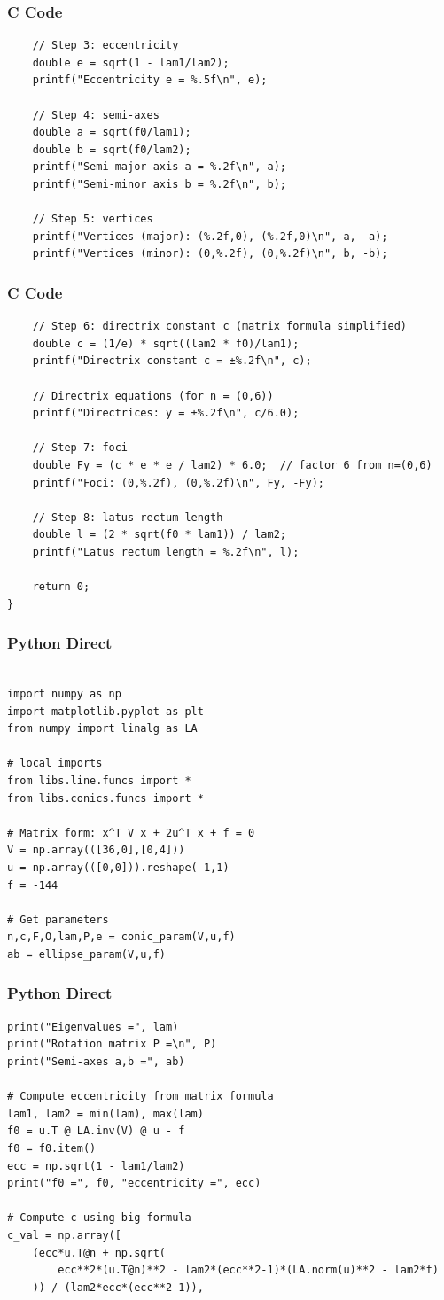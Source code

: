 \documentclass{beamer}
\begin{document}
\begin{frame}[fragile]
    \frametitle{C Code}
    \begin{lstlisting}
    // Step 3: eccentricity
    double e = sqrt(1 - lam1/lam2);
    printf("Eccentricity e = %.5f\n", e);

    // Step 4: semi-axes
    double a = sqrt(f0/lam1);
    double b = sqrt(f0/lam2);
    printf("Semi-major axis a = %.2f\n", a);
    printf("Semi-minor axis b = %.2f\n", b);

    // Step 5: vertices
    printf("Vertices (major): (%.2f,0), (%.2f,0)\n", a, -a);
    printf("Vertices (minor): (0,%.2f), (0,%.2f)\n", b, -b);
  \end{lstlisting}
\end{frame}
\begin{frame}[fragile]
    \frametitle{C Code}
    \begin{lstlisting}
    // Step 6: directrix constant c (matrix formula simplified)
    double c = (1/e) * sqrt((lam2 * f0)/lam1);
    printf("Directrix constant c = ±%.2f\n", c);

    // Directrix equations (for n = (0,6))
    printf("Directrices: y = ±%.2f\n", c/6.0);

    // Step 7: foci
    double Fy = (c * e * e / lam2) * 6.0;  // factor 6 from n=(0,6)
    printf("Foci: (0,%.2f), (0,%.2f)\n", Fy, -Fy);

    // Step 8: latus rectum length
    double l = (2 * sqrt(f0 * lam1)) / lam2;
    printf("Latus rectum length = %.2f\n", l);

    return 0;
}

    \end{lstlisting}
\end{frame}
\begin{frame}[fragile]
    \frametitle{Python Direct}
    \begin{lstlisting}
        
import numpy as np
import matplotlib.pyplot as plt
from numpy import linalg as LA

# local imports
from libs.line.funcs import *
from libs.conics.funcs import *

# Matrix form: x^T V x + 2u^T x + f = 0
V = np.array(([36,0],[0,4]))
u = np.array(([0,0])).reshape(-1,1)
f = -144

# Get parameters
n,c,F,O,lam,P,e = conic_param(V,u,f)
ab = ellipse_param(V,u,f)
\end{lstlisting}
\end{frame}
\begin{frame}[fragile]
    \frametitle{Python Direct}
    \begin{lstlisting}
print("Eigenvalues =", lam)
print("Rotation matrix P =\n", P)
print("Semi-axes a,b =", ab)

# Compute eccentricity from matrix formula
lam1, lam2 = min(lam), max(lam)
f0 = u.T @ LA.inv(V) @ u - f
f0 = f0.item()
ecc = np.sqrt(1 - lam1/lam2)
print("f0 =", f0, "eccentricity =", ecc)

# Compute c using big formula
c_val = np.array([
    (ecc*u.T@n + np.sqrt(
        ecc**2*(u.T@n)**2 - lam2*(ecc**2-1)*(LA.norm(u)**2 - lam2*f)
    )) / (lam2*ecc*(ecc**2-1)),
    \end{lstlisting}
\end{frame}
\end{document}
